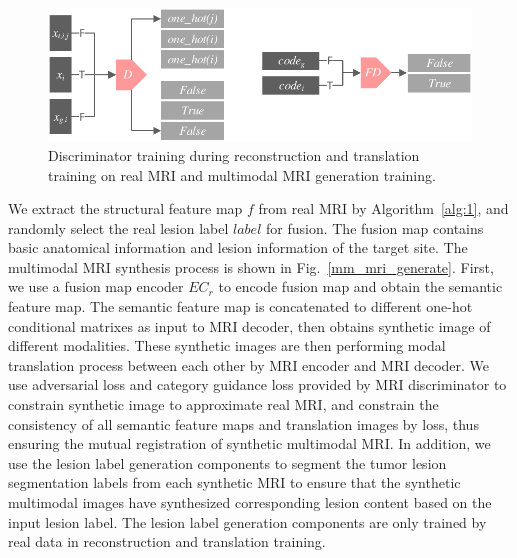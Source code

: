 \documentclass{ecai}
\begin{document}
\begin{figure}
	\centering
	\includegraphics[width=0.95\columnwidth]{figures/D}
	\caption{Discriminator training during reconstruction and translation training on real MRI and multimodal MRI generation training.}
	\label{train_D}
\end{figure}
We extract the structural feature map $f$ from real MRI by Algorithm~\ref{alg:1}, and randomly select the real lesion label $label$ for fusion. The fusion map contains basic anatomical information and lesion information of the target site. The multimodal MRI synthesis process is shown in Fig.~\ref{mm_mri_generate}. First, we use a fusion map encoder $EC_r$ to encode fusion map and obtain the semantic feature map. The semantic feature map is concatenated to different one-hot conditional matrixes as input to MRI decoder, then obtains synthetic image of different modalities. These synthetic images are then performing modal translation process between each other by MRI encoder and MRI decoder. We use adversarial loss and category guidance loss provided by MRI discriminator to constrain synthetic image to approximate real MRI, and constrain the consistency of all semantic feature maps and translation images by loss, thus ensuring the mutual registration of synthetic multimodal MRI. In addition, we use the lesion label generation components to segment the tumor lesion segmentation labels from each synthetic MRI to ensure that the synthetic multimodal images have synthesized corresponding lesion content based on the input lesion label. The lesion label generation components are only trained by real data in reconstruction and translation training. 
\end{document}
